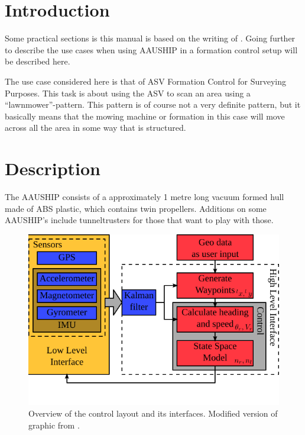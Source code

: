 \section{Introduction}

Some practical sections is this manual is based on the writing of
\cite{12gr730}. Going further to describe the use cases when using
AAUSHIP in a formation control setup will be described here.

The use case considered here is that of \ac{ASV} Formation Control for
Surveying Purposes. This task is about using the \ac{ASV} to scan an
area using a ``lawnmower''-pattern. This pattern is of course not a
very definite pattern, but it basically means that the mowing machine
or formation in this case will move across all the area in some way
that is structured.

\section{Description} The AAUSHIP consists of a approximately 1 metre
long vacuum formed hull made of ABS plastic, which contains twin
propellers. Additions on some AAUSHIP's include tunneltrusters for
those that want to play with those.

\begin{figure}[htbp]
	\includegraphics[width=\textwidth]{fig/vessel-block-overview}
	\caption{Overview of the control layout and its interfaces.
		Modified version of graphic from \citep{12gr730}.}
	\label{fig:vessel-block-overview}
\end{figure}
